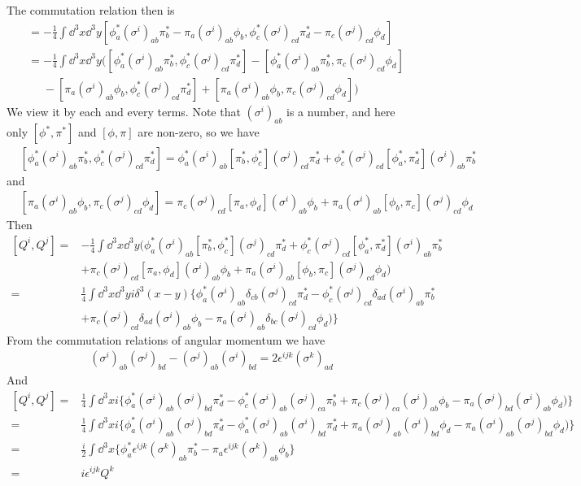 \documentclass{article}
\newcommand{\del}[2]{\delta_{#1#2}}
\begin{document}
The commutation relation then is
\begin{align*}
  [Q^i,Q^j]&=-\frac{1}{4}\int\dd^3x\dd^3y[\phi_a^*(\sigma^i)_{ab}\pi_b^*-\pi_a(\sigma^i)_{ab}\phi_b,\phi_c^*(\sigma^j)_{cd}\pi_d^*-\pi_c(\sigma^j)_{cd}\phi_d]\\
  &=-\frac{1}{4}\int\dd^3x\dd^3y([\phi_a^*(\sigma^i)_{ab}\pi_b^*,\phi_c^*(\sigma^j)_{cd}\pi_d^*]-[\phi_a^*(\sigma^i)_{ab}\pi_b^*,\pi_c(\sigma^j)_{cd}\phi_d]\\&\phantom{=}-[\pi_a(\sigma^i)_{ab}\phi_b,\phi_c^*(\sigma^j)_{cd}\pi_d^*]+[\pi_a(\sigma^i)_{ab}\phi_b,\pi_c(\sigma^j)_{cd}\phi_d])
\end{align*}
We view it by each and every terms. Note that $(\sigma ^i)_{ab}$ is a number, and here only $[\phi^*,\pi^*]$ and $[\phi,\pi]$ are non-zero, so we have
\begin{align*}
  &[\phi_a^*(\sigma^i)_{ab}\pi_b^*,\phi_c^*(\sigma^j)_{cd}\pi_d^*]=\phi_a^*(\sigma^i)_{ab}[\pi_b^*,\phi_c^*](\sigma^j)_{cd}\pi_d^*+\phi^*_c(\sigma^j)_{cd}[\phi_a^*,\pi_d^*](\sigma^i)_{ab}\pi_b^*
\end{align*}
and
\begin{align*}
  &[\pi_a(\sigma^i)_{ab}\phi_b,\pi_c(\sigma^j)_{cd}\phi_d]=\pi_c(\sigma^j)_{cd}[\pi_a,\phi_d](\sigma^i)_{ab}\phi_b+\pi_a(\sigma^i)_{ab}[\phi_b,\pi_c](\sigma^j)_{cd}\phi_d
\end{align*}
Then
\begin{align}
  \nonumber [Q^i,Q^j]=&-\frac{1}{4}\int\dd^3x\dd^3y(\phi_a^*(\sigma^i)_{ab}[\pi_b^*,\phi_c^*](\sigma^j)_{cd}\pi_d^*+\phi^*_c(\sigma^j)_{cd}[\phi_a^*,\pi_d^*](\sigma^i)_{ab}\pi_b^*\\\nonumber&+\pi_c(\sigma^j)_{cd}[\pi_a,\phi_d](\sigma^i)_{ab}\phi_b+\pi_a(\sigma^i)_{ab}[\phi_b,\pi_c](\sigma^j)_{cd}\phi_d)\\
  \nonumber=&\frac{1}{4}\int\dd^3x\dd^3yi\delta^3(x-y)\{\phi_a^*(\sigma^i)_{ab}\del{c}{b}(\sigma^j)_{cd}\pi_d^*-\phi^*_c(\sigma^j)_{cd}\del{a}{d}(\sigma^i)_{ab}\pi_b^*\\\nonumber&+\pi_c(\sigma^j)_{cd}\del{a}{d}(\sigma^i)_{ab}\phi_b-\pi_a(\sigma^i)_{ab}\del{b}{c}(\sigma^j)_{cd}\phi_d)\}
\end{align}
From the commutation relations of angular momentum we have
\begin{align*}
  (\sigma^i)_{ab}(\sigma^j)_{bd}-(\sigma^j)_{ab}(\sigma^i)_{bd}=2\epsilon^{ijk}(\sigma^k)_{ad}
\end{align*}
And
\begin{align}
  \nonumber [Q^i,Q^j]=&\frac{1}{4}\int\dd^3xi\{\phi_a^*(\sigma^i)_{ab}(\sigma^j)_{bd}\pi_d^*-\phi^*_c(\sigma^i)_{ab}(\sigma^j)_{ca}\pi_b^*+\pi_c(\sigma^j)_{ca}(\sigma^i)_{ab}\phi_b-\pi_a(\sigma^j)_{bd}(\sigma^i)_{ab}\phi_d)\}\\
  \nonumber=&\frac{1}{4}\int\dd^3xi\{\phi_a^*(\sigma^i)_{ab}(\sigma^j)_{bd}\pi_d^*-\phi^*_a(\sigma^j)_{ab}(\sigma^i)_{bd}\pi_d^*+\pi_a(\sigma^j)_{ab}(\sigma^i)_{bd}\phi_d-\pi_a(\sigma^i)_{ab}(\sigma^j)_{bd}\phi_d)\}\\
  \nonumber=&\frac{i}{2}\int\dd^3x\{\phi^*_a\epsilon^{ijk}(\sigma^k)_{ab}\pi_b^*-\pi_a\epsilon^{ijk}(\sigma^k)_{ab}\phi_b\}\\
  =&i\epsilon^{ijk}Q^k
\end{align}
\end{document}
